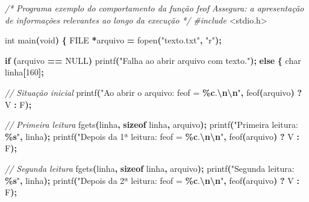 \documentclass[
  11pt,
  a4paper,
]{scrbook}
\newenvironment{Shaded}{\begin{snugshade}}{\end{snugshade}}
\newcommand{\CharTok}[1]{\textcolor[rgb]{0.31,0.60,0.02}{#1}}
\newcommand{\CommentTok}[1]{\textcolor[rgb]{0.56,0.35,0.01}{\textit{#1}}}
\newcommand{\ControlFlowTok}[1]{\textcolor[rgb]{0.13,0.29,0.53}{\textbf{#1}}}
\newcommand{\DataTypeTok}[1]{\textcolor[rgb]{0.13,0.29,0.53}{#1}}
\newcommand{\DecValTok}[1]{\textcolor[rgb]{0.00,0.00,0.81}{#1}}
\newcommand{\ImportTok}[1]{#1}
\newcommand{\KeywordTok}[1]{\textcolor[rgb]{0.13,0.29,0.53}{\textbf{#1}}}
\newcommand{\NormalTok}[1]{#1}
\newcommand{\OperatorTok}[1]{\textcolor[rgb]{0.81,0.36,0.00}{\textbf{#1}}}
\newcommand{\PreprocessorTok}[1]{\textcolor[rgb]{0.56,0.35,0.01}{\textit{#1}}}
\newcommand{\SpecialCharTok}[1]{\textcolor[rgb]{0.81,0.36,0.00}{\textbf{#1}}}
\newcommand{\StringTok}[1]{\textcolor[rgb]{0.31,0.60,0.02}{#1}}
\begin{document}
\begin{Shaded}
\begin{Highlighting}[]
\CommentTok{/*}
\CommentTok{Programa exemplo do comportamento da função feof}
\CommentTok{Assegura: a apresentação de informações relevantes ao longo da execução}
\CommentTok{*/}
\PreprocessorTok{\#include }\ImportTok{\textless{}stdio.h\textgreater{}}

\DataTypeTok{int}\NormalTok{ main}\OperatorTok{(}\DataTypeTok{void}\OperatorTok{)} \OperatorTok{\{}
    \DataTypeTok{FILE} \OperatorTok{*}\NormalTok{arquivo }\OperatorTok{=}\NormalTok{ fopen}\OperatorTok{(}\StringTok{"texto.txt"}\OperatorTok{,} \StringTok{"r"}\OperatorTok{);}

    \ControlFlowTok{if} \OperatorTok{(}\NormalTok{arquivo }\OperatorTok{==}\NormalTok{ NULL}\OperatorTok{)}
\NormalTok{        printf}\OperatorTok{(}\StringTok{"Falha ao abrir arquivo com texto."}\OperatorTok{);}
    \ControlFlowTok{else} \OperatorTok{\{}
        \DataTypeTok{char}\NormalTok{ linha}\OperatorTok{[}\DecValTok{160}\OperatorTok{];}

        \CommentTok{// Situação inicial}
\NormalTok{        printf}\OperatorTok{(}\StringTok{"Ao abrir o arquivo: feof = }\SpecialCharTok{\%c}\StringTok{.}\SpecialCharTok{\textbackslash{}n\textbackslash{}n}\StringTok{"}\OperatorTok{,}\NormalTok{ feof}\OperatorTok{(}\NormalTok{arquivo}\OperatorTok{)} \OperatorTok{?} \CharTok{\textquotesingle{}V\textquotesingle{}} \OperatorTok{:} \CharTok{\textquotesingle{}F\textquotesingle{}}\OperatorTok{);}

        \CommentTok{// Primeira leitura}
\NormalTok{        fgets}\OperatorTok{(}\NormalTok{linha}\OperatorTok{,} \KeywordTok{sizeof}\NormalTok{ linha}\OperatorTok{,}\NormalTok{ arquivo}\OperatorTok{);}
\NormalTok{        printf}\OperatorTok{(}\StringTok{"Primeira leitura: }\SpecialCharTok{\%s}\StringTok{"}\OperatorTok{,}\NormalTok{ linha}\OperatorTok{);}
\NormalTok{        printf}\OperatorTok{(}\StringTok{"Depois da 1ª leitura: feof = }\SpecialCharTok{\%c}\StringTok{.}\SpecialCharTok{\textbackslash{}n\textbackslash{}n}\StringTok{"}\OperatorTok{,}
\NormalTok{               feof}\OperatorTok{(}\NormalTok{arquivo}\OperatorTok{)} \OperatorTok{?} \CharTok{\textquotesingle{}V\textquotesingle{}} \OperatorTok{:} \CharTok{\textquotesingle{}F\textquotesingle{}}\OperatorTok{);}

        \CommentTok{// Segunda leitura}
\NormalTok{        fgets}\OperatorTok{(}\NormalTok{linha}\OperatorTok{,} \KeywordTok{sizeof}\NormalTok{ linha}\OperatorTok{,}\NormalTok{ arquivo}\OperatorTok{);}
\NormalTok{        printf}\OperatorTok{(}\StringTok{"Segunda leitura: }\SpecialCharTok{\%s}\StringTok{"}\OperatorTok{,}\NormalTok{ linha}\OperatorTok{);}
\NormalTok{        printf}\OperatorTok{(}\StringTok{"Depois da 2ª leitura: feof = }\SpecialCharTok{\%c}\StringTok{.}\SpecialCharTok{\textbackslash{}n\textbackslash{}n}\StringTok{"}\OperatorTok{,}
\NormalTok{               feof}\OperatorTok{(}\NormalTok{arquivo}\OperatorTok{)} \OperatorTok{?} \CharTok{\textquotesingle{}V\textquotesingle{}} \OperatorTok{:} \CharTok{\textquotesingle{}F\textquotesingle{}}\OperatorTok{);}


\end{Highlighting}
\end{Shaded}
\end{document}
